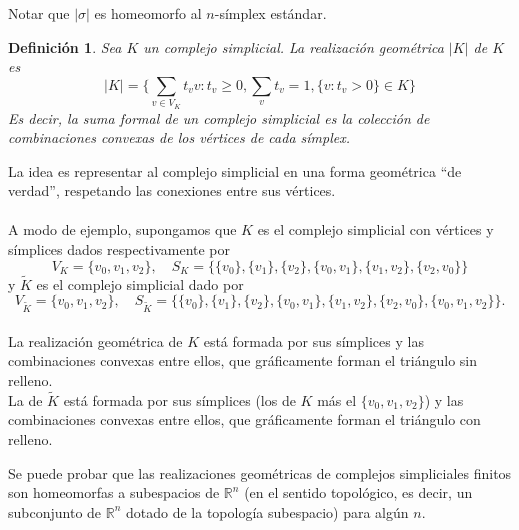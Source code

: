 \documentclass[12pt,a4paper]{article}
\newtheorem{definition}[theorem]{Definición}
\begin{document}
Notar que $|\sigma|$ es homeomorfo al $n$-símplex estándar.
\begin{definition}    
Sea $K$ un complejo simplicial. La realización geométrica $|K|$ de $K$ es
\[
|K| = \{ \sum_{v \in V_K} t_v v : t_v \ge 0, \sum_{v} t_v = 1, \{v : t_v > 0\} \in K \}
\]
Es decir, la suma formal de un complejo simplicial es la colección de combinaciones convexas de los vértices de cada símplex.
\end{definition}
La idea es representar al complejo simplicial en una forma geométrica ``de verdad'', respetando las conexiones entre sus vértices.
\\
\\
A modo de ejemplo, supongamos que $K$ es el complejo simplicial  con vértices y símplices dados respectivamente por 
$$V_K = \{v_0,v_1,v_2 \}, \quad S_K = \{ \{v_0\},\{v_1\},\{v_2\},\{v_0,v_1\}, \{v_1,v_2\}, \{v_2,v_0\}\}$$
 y $\tilde{K}$ es el complejo simplicial dado por 
$$V_{\tilde{K}} = \{v_0,v_1,v_2 \}, \quad  S_{\tilde{K}} = \{ \{v_0\},\{v_1\},\{v_2\},\{v_0,v_1\}, \{v_1,v_2\}, \{v_2,v_0\}, \{v_0,v_1,v_2\}\}.$$
\\
La realización geométrica de $K$ está formada por sus símplices y las combinaciones convexas entre ellos, que gráficamente forman el triángulo sin relleno.
\\
La de $\tilde{K}$ está formada por sus símplices (los de $K$ más el $\{v_0,v_1,v_2\}$) y las combinaciones convexas entre ellos, que gráficamente forman el triángulo con relleno.
\begin{center}
\hspace{2cm}
\end{center}
Se puede probar que las realizaciones geométricas de complejos simpliciales finitos son homeomorfas a subespacios de $\mathbb{R}^n$ (en el sentido topológico, es decir, un subconjunto de $\mathbb{R}^n$ dotado de la topología subespacio) para algún $n$.
\\
\end{document}
